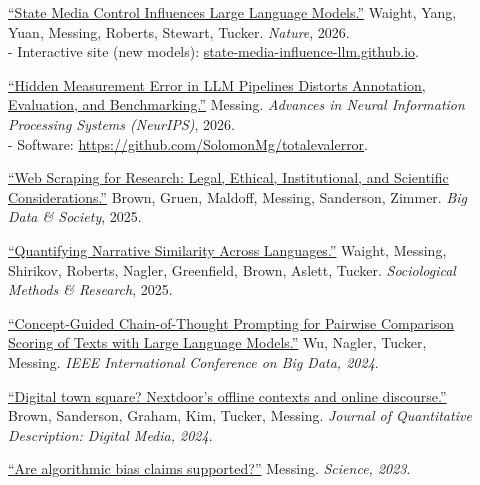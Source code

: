 \documentclass[letterpaper,11pt]{article}
\newcommand{\resheading}[1]{\vspace{4pt}{\large
\colorbox{mygrey}{\begin{minipage}{\textwidth}{\textbf{#1
\vphantom{p\^{E}}}}\end{minipage}}}\vspace{4pt}}
\begin{document}
\resheading{Publications}
\begin{description}

\item[] \href{https://doi.org/10.1038/s41586-026-10506-7}{``State Media Control Influences Large Language Models.''}  Waight, Yang, Yuan, Messing, Roberts, Stewart, Tucker.
\emph{Nature}, 2026. \\
- Interactive site (new models): \href{https://state-media-influence-llm.github.io}{state-media-influence-llm.github.io}. \\

\item[] \href{https://arxiv.org/abs/2604.11581}{``Hidden Measurement Error in LLM Pipelines Distorts Annotation, Evaluation, and Benchmarking.''}  Messing.
\emph{Advances in Neural Information Processing Systems (NeurIPS)}, 2026. \\
- Software: \url{https://github.com/SolomonMg/totalevalerror}. \\

\item[] \href{https://doi.org/10.1177/20539517251381686}{``Web Scraping for Research: Legal, Ethical, Institutional, and Scientific Considerations.''}   Brown, Gruen, Maldoff, Messing, Sanderson, Zimmer.
\emph{Big Data \& Society}, 2025. \\

\item[] \href{https://solomonmg.github.io/pdf/Quantifying_Narrative_Similarity_Across_Languages.pdf}{``Quantifying Narrative Similarity Across Languages.''}  Waight, Messing, Shirikov, Roberts, Nagler, Greenfield, Brown, Aslett, Tucker.
\emph{Sociological Methods \& Research}, 2025. \\

\item[] \href{https://ieeexplore.ieee.org/document/10825235}{``Concept-Guided Chain-of-Thought Prompting for Pairwise Comparison Scoring of Texts with Large Language Models.''} Wu, Nagler, Tucker, Messing.
\emph{IEEE International Conference on Big Data, 2024}. \\ 

\item[] \href{https://journalqd.org/article/view/5891}{``Digital town square? Nextdoor's offline contexts and online discourse.''}   Brown, Sanderson, Graham, Kim, Tucker, Messing.
\emph{Journal of Quantitative Description: Digital Media, 2024}. \\ 


\item[] \href{https://solomonmg.github.io/pdf/science.adk1211.pdf}{``Are algorithmic bias claims supported?''} Messing.
\emph{Science, 2023}. \\ 




\end{description}
\end{document}
